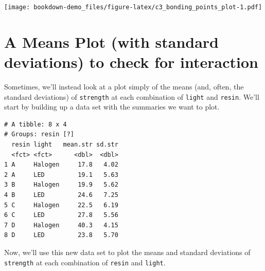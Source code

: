 \documentclass[]{book}
\newenvironment{Shaded}{\begin{snugshade}}{\end{snugshade}}
\newcommand{\KeywordTok}[1]{\textcolor[rgb]{0.13,0.29,0.53}{\textbf{#1}}}
\newcommand{\DataTypeTok}[1]{\textcolor[rgb]{0.13,0.29,0.53}{#1}}
\newcommand{\StringTok}[1]{\textcolor[rgb]{0.31,0.60,0.02}{#1}}
\newcommand{\OperatorTok}[1]{\textcolor[rgb]{0.81,0.36,0.00}{\textbf{#1}}}
\newcommand{\NormalTok}[1]{#1}
\theoremstyle{definition}
\theoremstyle{definition}
\theoremstyle{definition}
\theoremstyle{remark}
\begin{document}
\texttt{[image: bookdown-demo\_files/figure-latex/c3\_bonding\_points\_plot-1.pdf]}

\section{A Means Plot (with standard deviations) to check for
interaction}\label{a-means-plot-with-standard-deviations-to-check-for-interaction}

Sometimes, we'll instead look at a plot simply of the means (and, often,
the standard deviations) of \texttt{strength} at each combination of
\texttt{light} and \texttt{resin}. We'll start by building up a data set
with the summaries we want to plot.

\begin{Shaded}
\end{Shaded}

\begin{verbatim}
# A tibble: 8 x 4
# Groups: resin [?]
  resin light   mean.str sd.str
  <fct> <fct>      <dbl>  <dbl>
1 A     Halogen     17.8   4.02
2 A     LED         19.1   5.63
3 B     Halogen     19.9   5.62
4 B     LED         24.6   7.25
5 C     Halogen     22.5   6.19
6 C     LED         27.8   5.56
7 D     Halogen     40.3   4.15
8 D     LED         23.8   5.70
\end{verbatim}

Now, we'll use this new data set to plot the means and standard
deviations of \texttt{strength} at each combination of \texttt{resin}
and \texttt{light}.
\end{document}
